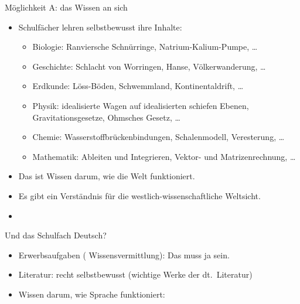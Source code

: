 \begin{frame}
  {Möglichkeit A: das Wissen an sich}
  \pause
  \begin{itemize}[<+->]
    \item \alert{Schulfächer lehren selbstbewusst ihre \alert{Inhalte}:}
      \begin{itemize}[<+->]
        \item Biologie: Ranviersche Schnürringe, Natrium-Kalium-Pumpe, \ldots
        \item Geschichte: Schlacht von Worringen, Hanse, Völkerwanderung, \ldots
        \item Erdkunde: Löss-Böden, Schwemmland, Kontinentaldrift, \ldots
        \item Physik: idealisierte Wagen auf idealisierten schiefen Ebenen,\\
          Gravitationsgesetze, Ohmsches Gesetz, \ldots
        \item Chemie: Wasserstoffbrückenbindungen, Schalenmodell, Veresterung, \ldots
        \item Mathematik: Ableiten und Integrieren, Vektor- und Matrizenrechnung, \ldots
      \end{itemize}
      \Viertelzeile
    \item Das ist Wissen darum, wie die Welt funktioniert.
    \item Es gibt ein Verständnis für die westlich-wissenschaftliche Weltsicht.
    \item {}
  \end{itemize}
\end{frame}

\begin{frame}
  {Und das Schulfach Deutsch?}
  \pause
    \begin{itemize}[<+->]
      \item Erwerbsaufgaben ( Wissensvermittlung): Das muss ja sein. 
      \item Literatur: recht selbstbewusst (\zB wichtige Werke der dt.\ Literatur)
        \Halbzeile
      \item Wissen darum, wie Sprache funktioniert: 
    \end{itemize}
\end{frame}

